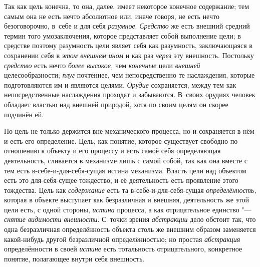 Так как цель конечна, то она, далее, имеет некоторое конечное
содержание; тем самым она не есть нечто абсолютное или, иначе говоря, не
есть нечто безоговорочно, в~себе и для себя
{\em разумное}.
{\em Средство} же есть
внешний средний термин того умозаключения, которое представляет собой
выполнение цели; в средстве поэтому разумность цели являет себя как
разумность, заключающаяся в сохранении себя в
{\em этом внешнем ином}
и как раз {\em через}
эту внешность. Постольку
{\em средство} есть нечто
{\em более высокое,} чем
{\em конечные} цели
{\em внешней}
целесообразности;
{\em плуг} почтеннее, чем
непосредственно те наслаждения, которые подготовляются им и являются
целями. {\em Орудие}
сохраняется, между тем как непосредственные наслаждения
проходят и забываются. В~своих орудиях человек обладает властью над внешней
природой, хотя по своим целям он скорее подчинён ей.

Но цель не только держится вне механического процесса, но и
сохраняется в нём и есть его определение. Цель, как понятие, которое
существует свободно по отношению к объекту и его процессу и есть самоё себя
определяющая деятельность, сливается в механизме лишь с самой собой, так
как она вместе с тем есть в-себе-и-для-себя-сущая истина механизма. Власть
цели над объектом есть это для-себя-сущее тождество, и её деятельность есть
проявление этого тождества. Цель как
{\em содержание} есть та
в-себе-и-для-себя-сущая
{\em определённость,}
которая в объекте выступает как безразличная и внешняя,
деятельность же этой цели есть, с одной стороны,
{\em истина} процесса, а
как отрицательное единство "--- {\em снятие
видимости внешности}. С~точки зрения
{\em абстракции} дело
обстоит так, что одна безразличная определённость объекта столь же внешним
образом заменяется какой-нибудь другой безразличной определённостью; но
простая {\em абстракция}
определённости в своей
{\em истине} есть
тотальность отрицательного, конкретное понятие, полагающее внутри себя
внешность.

